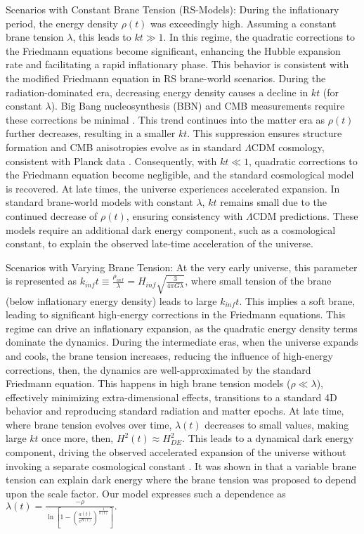 \documentclass[12pt]{article}  %
\begin{document}
Scenarios with Constant Brane Tension (RS-Models): 
During the inflationary period, the energy density $\rho(t)$ was exceedingly high. Assuming a constant brane tension $\lambda$, this leads to $kt \gg 1$. In this regime, the quadratic corrections to the Friedmann equations become significant, enhancing the Hubble expansion rate and facilitating a rapid inflationary phase. This behavior is consistent with the modified Friedmann equation in RS brane-world scenarios. 
During the radiation-dominated era, decreasing energy density causes a decline in $kt$ (for constant $\lambda$). Big Bang nucleosynthesis (BBN) and CMB measurements require these corrections be minimal \cite{52}. This trend continues into the matter era as $\rho(t)$ further decreases, resulting in a smaller $kt$. This suppression ensures structure formation and CMB anisotropies evolve as in standard $\Lambda$CDM cosmology, consistent with Planck data \cite{53}. Consequently, with $kt\ll1$, quadratic corrections to the Friedmann equation become negligible, and the standard cosmological model is recovered.
At late times, the universe experiences accelerated expansion. In standard brane-world models with constant $\lambda$, $kt$ remains small due to the continued decrease of $\rho(t)$, ensuring consistency with $\Lambda$CDM predictions. 
These models require an additional dark energy component, such as a cosmological constant, to explain the observed late-time acceleration of the universe.

Scenarios with Varying Brane Tension: At the very early universe, this parameter is represented as $k_{inf}t\equiv \frac{\rho_{inf}}{\lambda}=H_{inf}\sqrt{\frac{3}{4\pi G \lambda}} $, where small tension of the brane (below inflationary energy density) leads to large $k_{inf}t$. This implies a soft brane, leading to significant high-energy corrections in the Friedmann equations. This regime can drive an inflationary expansion, as the quadratic energy density terms dominate the dynamics.
During the intermediate eras, when the universe expands and cools, the brane tension increases, reducing the influence of high-energy corrections, then, the dynamics are well-approximated by the standard Friedmann equation. This happens in high brane tension models ($\rho\ll \lambda$), effectively minimizing extra-dimensional effects, transitions to a standard 4D behavior and reproducing standard radiation and matter epochs. At late time, where brane tension evolves over time, $\lambda(t)$ decreases to small values, making large $kt$ once more, then, $H^{2}(t)\approx H_{DE}^{2}$. This leads to a dynamical dark energy component, driving the observed accelerated expansion of the universe without invoking a separate cosmological constant \cite{54}. It was shown in \cite{48} that a variable brane tension can explain dark energy where the brane tension was proposed to depend upon the scale factor. Our model expresses such a dependence as 
 $\lambda(t)=\frac{-\rho}{\ln[1-(\frac{a(t)}{e^{H(t)}})^{\frac{1}{b(t)}}]}.$
\end{document}
